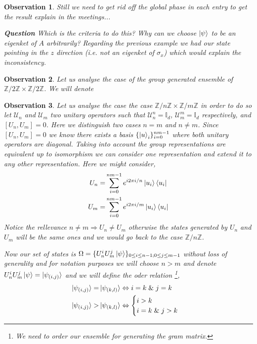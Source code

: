 \documentclass[12pt,letterpaper]{article}
\newtheorem{observation}{Observation}
\begin{document}
\begin{multicols}{2}
\begin{observation}
Still we need to get rid off the global phase in each entry to get the result explain in the meetings... \par
\textbf{Question} Which is the criteria to do this? Why can we choose $\ket{\psi}$ to be an eigenket of $A$ arbitrarily? Regarding the previous example we had our state pointing in the $z$ direction (i.e. not an eigenket of $\sigma_x$) which would explain the inconsistency.
\end{observation}
\begin{observation}
Let us analyse the case of the group generated ensemble of $\mathbb{Z}/2\mathbb{Z}\times\mathbb{Z}/2\mathbb{Z}$. We will denote 
\end{observation}
\begin{observation}\label{ObsZnZm}
Let us analyse the case the case $\mathbb{Z}/n\mathbb{Z}\times\mathbb{Z}/m\mathbb{Z}$ in order to do so let $\mathcal{U}_n$ and $\mathcal{U}_m$ two unitary operators such that $\mathcal{U}_n^n=\mathbb{I}_d$, $\mathcal{U}_m^m=\mathbb{I}_d$ respectively, and $[U_n,U_m]=0$. Here we distinguish two cases $n=m$ and $n\neq m$. Since $[U_n,U_m]=0$ we know there exists a basis $\{\ket{u}_i\}_{i=0}^{nm-1}$ where both unitary operators are diagonal. Taking into account the group representations are equivalent up to isomorphism we can consider one representation and extend it to any other representation. Here we might consider,
\begin{align}
U_n=&\sum_{i=0}^{nm-1}e^{i2\pi i/n}\ket{u_i}\bra{u_i}\\
U_m=&\sum_{i=0}^{nm-1}e^{i2\pi i/m}\ket{u_i}\bra{u_i}
\end{align}
Notice the rellevance $n\neq m\Rightarrow U_n\neq U_m$ otherwise the states generated by $U_n$ and $U_m$ will be the same ones and we would go back to the case $\mathbb{Z}/n\mathbb{Z}$. \par
Now our set of states is $\Omega=\{U_{n}^iU_{m}^j\ket{\psi}\}_{0\leq i\leq n-1; 0\leq j\leq m-1}$ without loss of generality and for notation purposes we will choose $n>m$ and denote $U_{n}^iU_{m}^j\ket{\psi}=\ket{\psi_{(i,j)}}$ and we will define the oder relation \footnote{We need to order our ensemble for generating the gram matrix.},
\begin{align}
\ket{\psi_{(i,j)}}=&\ket{\psi_{(k,l)}}\Leftrightarrow i=k\;\&\;j=k\\
\ket{\psi_{(i,j)}}>&\ket{\psi_{(k,l)}}\Leftrightarrow\begin{cases}i>k\\i=k\;\&\;j>k\end{cases}\\

\end{align}
\end{observation}
\end{multicols}
\end{document}
